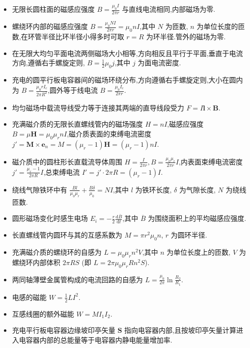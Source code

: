 \begin{itemize}
        \item 无限长圆柱面的磁感应强度 $B=\frac{\mu_0I}{2\pi r}$ 与直线电流相同,内部磁场为零.
        \item 螺绕环内部的磁感应强度 $B=\frac{\mu_0NI}{2\pi r}=\mu_0nI$,其中 $N$ 为匝数, $n$ 为单位长度的匝数,在环管半径比环半径小得多时可取 $r=R$ 为环半径.管外的磁场为零.
        \item 在无限大均匀平面电流两侧磁场大小相等,方向相反且平行于平面,垂直于电流方向,遵循右手螺旋定则, $B=\frac{1}{2}\mu_0j$,其中 $j$ 为面电流密度.
        \item 充电的圆平行板电容器间的磁场环绕分布,方向遵循右手螺旋定则,大小在圆内为 $B=\frac{\mu_0 rI_{c}}{2\pi R^2}$,圆外等于线电流 $B=\frac{\mu_0I_{c}}{2\pi r}$.
        \item 均匀磁场中载流导线受力等于连接其两端的直导线段受力 $F=I \bm{l}\times \bm{B}$.
        \item 充满磁介质的无限长直螺线管内的磁场强度 $H=nI$,磁感应强度 $B=\mu \bm{H}=\mu_0\mu_{r}nI$,磁介质表面的束缚电流密度 $j'=\bm{M}\times \bm{e}_{n}=M=\left( \mu_{r}-1 \right) \bm{H}=\left( \mu_{r}-1 \right) nI$.
        \item 磁介质中的圆柱形长直载流导体周围 $H=\frac{I}{2\pi r},B=\frac{\mu_0\mu_{r}}{2\pi r}I$,内表面束缚电流密度 $j'=\frac{\mu_{r}-1}{2\pi R}I$,总束缚电流 $I'=j'\cdot 2\pi R=\left( \mu_{r}-1 \right) I$.
        \item 绕线气隙铁环中有 $\frac{Bl}{\mu_0\mu_{r}}+\frac{B\delta}{\mu_0}=NI$,其中 $l$ 为铁环长度, $\delta$ 为气隙长度, $N$ 为绕线匝数.
        \item 圆形磁场变化时感生电场 $E_{i}=-\frac{r}{2}\frac{\mathrm{d}\overline{B}}{\mathrm{d}t}$,其中 $\overline{B}$ 为围绕面积上的平均磁感应强度.
        \item 长直螺线管内圆环与其的互感系数为 $M=\pi r^2 \mu_0n$, $r$ 为圆环半径.
        \item 充满磁介质的螺绕环的自感为 $L=\mu_0\mu_{r}n^2V$,其中 $n$ 为单位长度上的匝数, $V$ 为螺绕环内部体积 $2\pi RS$ (即 $L=2\pi\mu_0\mu_{r}Rn^2S$).
        \item 两同轴薄壁金属管构成的电流回路的自感为 $L=\frac{\mu_0}{2\pi}\ln \frac{R_2}{R_1}$.
        \item 电感的磁能 $W=\frac{1}{2}LI^2$.
        \item 互感线圈的额外磁能 $W=MI_1I_2$.
        \item 充电平行板电容器边缘坡印亭矢量 $\bm{S}$ 指向电容器内部,且按坡印亭矢量计算进入电容器内部的总能量等于电容器内静电能量增加率.
    \end{itemize}
